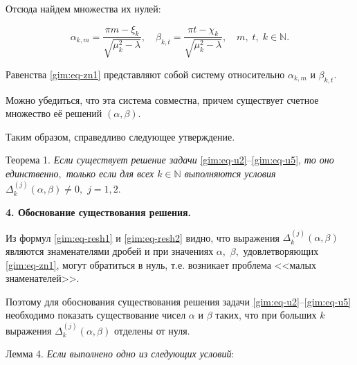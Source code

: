 Отсюда найдем  множества их нулей: 

\begin{equation}

\alpha_{k,m}=\frac{\pi m-\xi_k}{\sqrt{\mu_k^2-\lambda}},\quad 

\beta_{k,t}=\frac{\pi t-\chi_k}{\sqrt{\mu_k^2-\lambda}},\quad m,\;t,\;k\in \mathbb{N}.

\label{gim:eq-zn1}

\end{equation}



Равенства \eqref{gim:eq-zn1} представляют собой систему относительно $\alpha_{k,m}$ и $\beta_{k,t}.$ 

Можно убедиться, что эта система совместна, причем существует счетное множество её решений $(\alpha,\beta).$



Таким образом, справедливо следующее утверждение.



\smallskip



{\small\sc Теорема 1.} {\it Если существует решение задачи} \eqref{gim:eq-u2}--\eqref{gim:eq-u5}, {\it то оно единственно$,$ только если для всех $k\in \mathbb{N}$ выполняются условия $\Delta_{k}^{(j)}(\alpha,\beta)\ne 0,$ $j=1, 2.$ }



\vskip2mm



{\bf 4. Обоснование существования решения.}

Из формул \eqref{gim:eq-resh1} и \eqref{gim:eq-resh2} видно, что выражения $\Delta_{k}^{(j)}(\alpha,\beta)$ являются знаменателями дробей и при значениях $\alpha,$ $\beta,$ удовлетворяющих \eqref{gim:eq-zn1}, могут обратиться в нуль, т.е. возникает проблема <<малых знаменателей>>. 

Поэтому для обоснования существования решения задачи \eqref{gim:eq-u2}--\eqref{gim:eq-u5} необходимо показать существование чисел $\alpha$ и $\beta$ таких, что при больших $k$ выражения $\Delta_{k}^{(j)}(\alpha,\beta)$ отделены от нуля.



\smallskip





\hypertarget{gim:l4}{}



{\small \sc Лемма 4.} {\it Если выполнено одно из следующих условий}\/:

